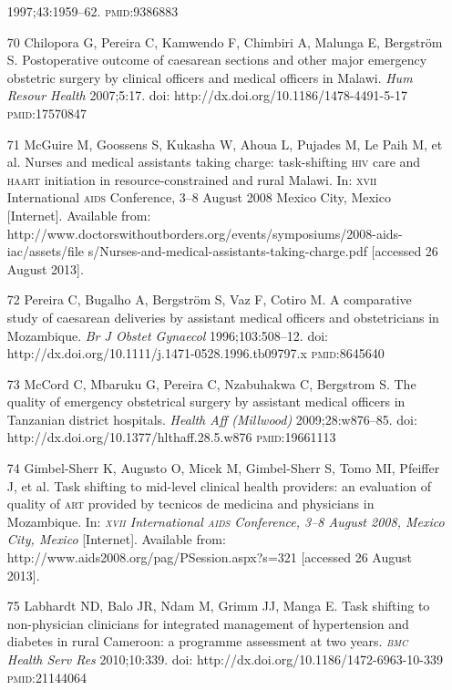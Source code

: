 \documentclass{article}
\begin{document}
\begin{itemize}
1997;43:1959–62. \textsc{pmid}:9386883

\item[70] Chilopora G, Pereira C, Kamwendo F, Chimbiri A, Malunga E, Bergström
S.
Postoperative outcome of caesarean sections and other major emergency obstetric
surgery by clinical
officers and medical officers in Malawi. \textit{Hum Resour Health}
2007;5:17. doi:
http://dx.doi.org/10.1186/1478-4491-5-17 \textsc{pmid}:17570847

\item[71] McGuire M, Goossens S, Kukasha W, Ahoua L, Pujades M, Le Paih M, et
al. Nurses and
medical assistants taking charge: task-shifting \textsc{hiv} care and \textsc{haart} initiation in
resource-constrained and rural Malawi. In: \textsc{xvii} International \textsc{aids} Conference,
3–8 August 2008
Mexico City, Mexico [Internet]. Available from:
http://www.doctorswithoutborders.org/events/symposiums/2008-aids-iac/assets/file
s/Nurses-and-medical-assistants-taking-charge.pdf
[accessed 26 August 2013].

\item[72] Pereira C, Bugalho A, Bergström S, Vaz F, Cotiro M. A comparative
study of caesarean
deliveries by assistant medical officers and obstetricians in Mozambique.
\textit{Br J Obstet
Gynaecol}
1996;103:508–12. doi: http://dx.doi.org/10.1111/j.1471-0528.1996.tb09797.x
\textsc{pmid}:8645640

\item[73] McCord C, Mbaruku G, Pereira C, Nzabuhakwa C, Bergstrom S. The quality
of emergency
obstetrical surgery by assistant medical officers in Tanzanian district
hospitals. \textit{Health
Aff (Millwood)}
2009;28:w876–85. doi: http://dx.doi.org/10.1377/hlthaff.28.5.w876
\textsc{pmid}:19661113

\item[74] Gimbel-Sherr K, Augusto O, Micek M, Gimbel-Sherr S, Tomo MI, Pfeiffer
J, et al. Task
shifting to mid-level clinical health providers: an evaluation of quality of \textsc{art}
provided by
tecnicos de medicina and physicians in Mozambique. In: \textit{\textsc{xvii}
International \textsc{aids} Conference,
3–8 August 2008, Mexico City, Mexico}
[Internet]. Available from:
http://www.aids2008.org/pag/PSession.aspx?s=321 [accessed 26 August 2013].

\item[75] Labhardt ND, Balo JR, Ndam M, Grimm JJ, Manga E. Task shifting to
non-physician
clinicians for integrated management of hypertension and diabetes in rural
Cameroon: a programme
assessment at two years. \textit{\textsc{bmc} Health Serv Res}
2010;10:339. doi:
http://dx.doi.org/10.1186/1472-6963-10-339 \textsc{pmid}:21144064


\end{itemize}
\end{document}
